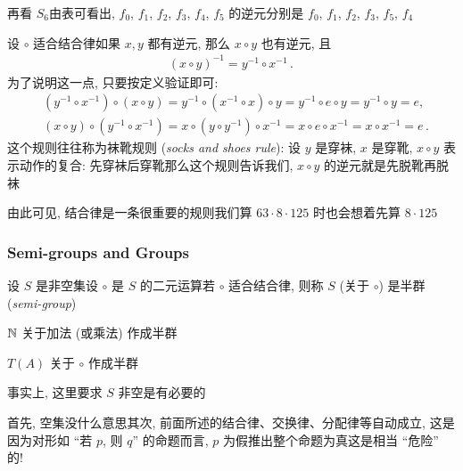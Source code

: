 \begin{example}
    再看 $S_6$\period 由表可看出, $f_0$, $f_1$, $f_2$, $f_3$, $f_4$, $f_5$ 的逆元分别是 $f_0$, $f_1$, $f_2$, $f_3$, $f_5$, $f_4$\period
\end{example}

\begin{remark}
    设 $\circ$ 适合结合律\period 如果 $x,y$ 都有逆元, 那么 $x \circ y$ 也有逆元, 且
    \begin{align*}
        (x \circ y)^{-1} = y^{-1} \circ x^{-1} \period
    \end{align*}
    为了说明这一点, 只要按定义验证即可:
    \begin{align*}
         & (y^{-1} \circ x^{-1}) \circ (x \circ y) = y^{-1} \circ (x^{-1} \circ x) \circ y = y^{-1} \circ e \circ y = y^{-1} \circ y = e,        \\
         & (x \circ y) \circ (y^{-1} \circ x^{-1}) = x \circ (y \circ y^{-1}) \circ x^{-1} = x \circ e \circ x^{-1} = x \circ x^{-1} = e \period
    \end{align*}
    这个规则往往称为袜靴规则 (\textit{socks and shoes rule}): 设 $y$ 是穿袜, $x$ 是穿靴, $x \circ y$ 表示动作的复合: 先穿袜后穿靴\period 那么这个规则告诉我们, $x \circ y$ 的逆元就是先脱靴再脱袜\period
\end{remark}

\begin{remark}
    由此可见, 结合律是一条很重要的规则\period 我们算 $63 \cdot 8 \cdot 125$ 时也会想着先算 $8 \cdot 125$\period
\end{remark}

\subsubsection*{Semi-groups and Groups}

\begin{definition}
    设 $S$ 是非空集\period 设 $\circ$ 是 $S$ 的二元运算\period 若 $\circ$ 适合结合律, 则称 $S$ (关于 $\circ$) 是半群 (\textit{semi-group})\period
\end{definition}

\begin{example}
    $\mathbb{N}$ 关于加法 (或乘法) 作成半群\period
\end{example}

\begin{example}
    $T(A)$ 关于 $\circ$ 作成半群\period
\end{example}

\begin{remark}
    事实上, 这里要求 $S$ 非空是有必要的\period

    首先, 空集没什么意思\period 其次, 前面所述的结合律、交换律、分配律等自动成立, 这是因为对形如 ``若 $p$, 则 $q$'' 的命题而言, $p$ 为假推出整个命题为真\period 这是相当 ``危险'' 的!
\end{remark}


